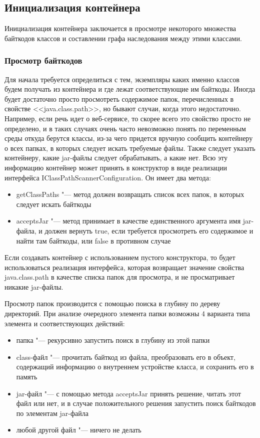 \subsection{Инициализация контейнера}

Инициализация контейнера заключается в просмотре некоторого множества байткодов классов и составлении графа наследования между этими классами.

\subsubsection{Просмотр байткодов}
Для начала требуется определиться с тем, экземпляры каких именно классов будем получать из контейнера и где лежат соответствующие им байткоды.
Иногда будет достаточно просто просмотреть содержимое папок, перечисленных в свойстве <<java.class.path>>, но бывают случаи, когда этого недостаточно. Например, если речь идет о
веб-сервисе, то скорее всего это свойство просто не определено, и в таких случаях очень часто невозможно понять по переменным среды откуда берутся классы, из-за чего придется
вручную сообщить контейнеру о всех папках, в которых следует искать требуемые файлы.
Также следует указать контейнеру, какие jar-файлы следует обрабатывать, а какие нет. 
Всю эту информацию контейнер может принять в конструктор в виде реализации интерфейса IClassPathScannerConfiguration.
Он имеет два метода:
\begin{itemize}
	\item getClassPaths "--- метод должен возвращать список всех папок, в которых следует искать байткоды
	\item acceptsJar "--- метод принимает в качестве единственного аргумента имя jar-файла, 
				и должен вернуть true, если требуется просмотреть его содержимое и найти там байткоды, или false в противном случае
	
\end{itemize}

Если создавать контейнер с использованием пустого конструктора, то будет использоваться реализация интерфейса, которая возвращает значение свойства java.class.path в качестве
списка папок для просмотра, и не просматривает никакие jar-файлы.

Просмотр папок производится с помощью поиска в глубину по дереву директорий. При анализе очередного элемента папки возможны 4 варианта типа элемента и соответствующих действий:
\begin{itemize}
	\item папка "--- рекурсивно запустить поиск в глубину из этой папки
	\item class-файл "--- прочитать байткод из файла, преобразовать его в объект, содержащий информацию о внутреннем устройстве класса, и сохранить его в память
	\item jar-файл "--- с помощью метода acceptsJar принять решение, читать этот файл или нет, и в случае положительного решения запустить поиск байткодов по элементам jar-файла
	\item любой другой файл "--- ничего не делать
\end{itemize}

